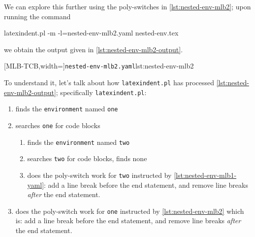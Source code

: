  \begin{example}
 We can explore this further using the poly-switches in \cref{lst:nested-env-mlb2}; upon
 running the command  

 \begin{commandshell}
latexindent.pl -m -l=nested-env-mlb2.yaml nested-env.tex
\end{commandshell}

 we obtain the output given in \cref{lst:nested-env-mlb2-output}.

 \begin{cmhtcbraster}
  [MLB-TCB,width=\linewidth]{\texttt{nested-env-mlb2.yaml}}{lst:nested-env-mlb2}
 \end{cmhtcbraster}

 To understand it, let's talk about how \texttt{latexindent.pl} has processed
 \cref{lst:nested-env-mlb2-output}; specifically \texttt{latexindent.pl}:
 \begin{enumerate}
  \item finds the \texttt{environment} named \texttt{one}
  \item   searches \texttt{one} for code blocks
        \begin{enumerate}
         \item finds the \texttt{environment} named \texttt{two}
         \item searches \texttt{two} for code blocks, finds none
         \item does the poly-switch work for \texttt{two} instructed by
               \cref{lst:nested-env-mlb1-yaml}: add a line break before the end
               statement, and remove line breaks \emph{after} the end statement.
        \end{enumerate}
  \item does the poly-switch work for \texttt{one} instructed by
        \cref{lst:nested-env-mlb2} which is: add a line break before the end statement,
        and remove line breaks \emph{after} the end statement.
 \end{enumerate}

 \end{example}

